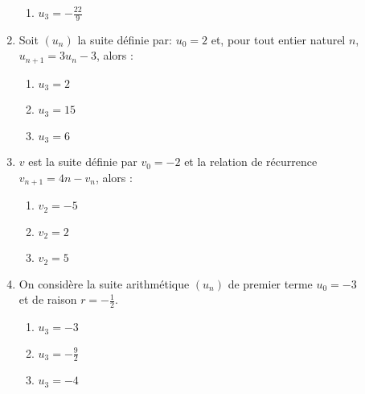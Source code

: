 \documentclass[oneside,twocolumn,landscape]{book}
\begin{document}
\begin{enumerate}
\begin{enumerate}
\item\BonneReponse $u_{3}=-\frac{22}{9}$

\end{enumerate}



\item Soit $\left(u_{n}\right)$ la suite définie par: $u_{0}=2$ et, pour tout entier naturel $n$, $u_{n+1}=3 u_{n}-3$, alors :

\begin{enumerate}

\item\MauvaiseReponse $u_{3}=2$

\item\BonneReponse $u_{3}=15$

\item\MauvaiseReponse $u_{3}=6$


\end{enumerate}



\newpage

\item $v$ est la suite définie par $v_{0}=-2$ et la relation de récurrence\\ $v_{n+1}=4n-v_{n}$, alors :

\begin{enumerate}


\item\MauvaiseReponse $v_{2}=-5$

\item\BonneReponse $v_{2}=2$

\item\MauvaiseReponse $v_{2}=5$

\end{enumerate}



\item On considère la suite arithmétique $\left(u_{n}\right)$ de premier terme $u_{0}=-3$\\ et de raison $r=-\frac{1}{2}$.

\begin{enumerate}

\item\MauvaiseReponse $u_{3}=-3$

\item\BonneReponse $u_{3}=-\frac{9}{2}$

\item\MauvaiseReponse $u_{3}=-4$


\end{enumerate}




\end{enumerate}
\end{document}
